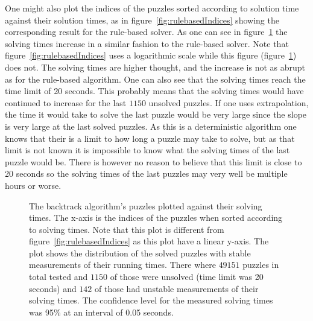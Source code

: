 \documentclass[a4paper,11pt]{kth-mag}
\begin{document}
\FloatBarrier
One might also plot the indices of the puzzles sorted according to solution time against their solution times, as in figure~\ref{fig:rulebasedIndices} showing the corresponding result for the rule-based solver.
As one can see in figure~\ref{fig:backtrackIndices} the solving times increase in a similar fashion to the rule-based solver.
Note that figure~\ref{fig:rulebasedIndices} uses a logarithmic scale while this figure (figure~\ref{fig:backtrackIndices}) does not.
The solving times are higher thought, and the increase is not as abrupt as for the rule-based algorithm.
One can also see that the solving times reach the time limit of 20 seconds.
This probably means that the solving times would have continued to increase for the last $1150$ unsolved puzzles.
If one uses extrapolation, the time it would take to solve the last puzzle would be very large since the slope is very large at the last solved puzzles. 
As this is a deterministic algorithm one knows that their is a limit to how long a puzzle may take to solve, but as that limit is not known it is impossible to know what the solving times of the last puzzle would be.
There is however no reason to believe that this limit is close to 20 seconds so the solving times of the last puzzles may very well be multiple hours or worse.
\\
\begin{figure}[here] 
\noindent{}
\vspace{-15pt}
\caption[Plot of backtrack solving times]{The backtrack algorithm's puzzles plotted against their solving times. The x-axis is the indices of the puzzles when sorted according to solving times. Note that this plot is different from figure~\ref{fig:rulebasedIndices} as this plot have a linear y-axis. The plot shows the distribution of the solved puzzles with stable measurements of their running times. There where $49151$ puzzles in total tested and $1150$ of those were unsolved (time limit was 20 seconds) and $142$ of those had unstable measurements of their solving times. The confidence level for the measured solving times was 95\% at an interval of 0.05 seconds.}
\label{fig:backtrackIndices}
\end{figure}
\end{document}

